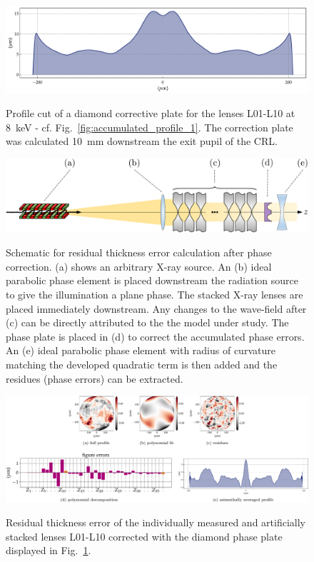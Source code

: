 \begin{refsection}
\begin{figure}[t]
        \centering
        {\includegraphics[width=0.6\linewidth]{figures/ch06/CDn_individual_8p0keV_n_10.0_lsp2p0mm_cpp10p0mm_phase_correction_plate_cut_2.pdf}}
        \caption[Diamond correction plate profile cut]{Profile cut of a diamond corrective plate for the lenses L01-L10 at 8~keV - cf. Fig.~\ref{fig:accumulated_profile_1}. The correction plate was calculated 10~mm downstream the exit pupil of the CRL.}\label{fig:plate_profile}
\end{figure}

\begin{figure}[t]
        \centering
        {\includegraphics[width=0.6\linewidth]{figures/ch06/recovered_phase_corrected.pdf}}
        \caption[Schematic for residual thickness error calculation after phase correction]{Schematic for residual thickness error calculation after phase correction. (a) shows an arbitrary X-ray source. An (b) ideal parabolic phase element is placed downstream the radiation source to give the illumination a plane phase. The stacked X-ray lenses are placed immediately downstream. Any changes to the wave-field after (c) can be directly attributed to the the model under study. The phase plate is placed in (d) to correct the accumulated phase errors. An (e) ideal parabolic phase element with radius of curvature matching the developed quadratic term is then added and the residues (phase errors) can be extracted.}\label{fig:recovered_phase_corrected}
\end{figure}

\begin{figure}[t]
        \centering
        {\includegraphics[width=1\linewidth]{figures/ch06/residual_profile.pdf}}
        \caption[Residual profile after phase correction]{Residual thickness error of the individually measured and artificially stacked lenses L01-L10 corrected with the diamond phase plate displayed in Fig.~\ref{fig:plate_profile}.}\label{fig:residual_profile}
\end{figure}


\end{refsection}
